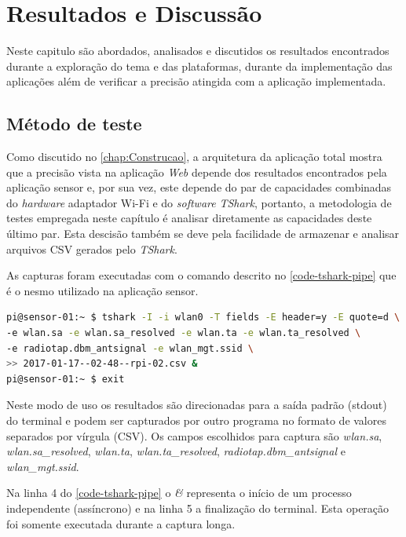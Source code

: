 \chapter{Resultados e Discussão}
\label{chap:resultados}

Neste capitulo são abordados, analisados e discutidos os resultados encontrados
durante a exploração do tema e das plataformas, durante da implementação das
aplicações além de verificar a precisão atingida com a aplicação implementada.


\section{Método de teste}
\label{sec:metodo-teste}

Como discutido no \autoref{chap:Construcao}, a arquitetura da aplicação total
mostra que a precisão vista na aplicação \emph{Web} depende dos resultados
encontrados pela aplicação sensor e, por sua vez, este depende do par de
capacidades combinadas do \emph{hardware} adaptador Wi-Fi e do \emph{software}
\emph{TShark}, portanto, a metodologia de testes empregada neste capítulo é
analisar diretamente as capacidades deste último par. Esta descisão também se
deve pela facilidade de armazenar e analisar arquivos CSV gerados pelo
\emph{TShark}.

As capturas foram executadas com o comando descrito no \autoref{code-tshark-pipe}
que é o nesmo utilizado na aplicação sensor.

\begin{lstlisting}[language=bash,caption={TShark e redirecionamento da saída para arquivo assíncrono},label=code-tshark-pipe]
pi@sensor-01:~ $ tshark -I -i wlan0 -T fields -E header=y -E quote=d \
-e wlan.sa -e wlan.sa_resolved -e wlan.ta -e wlan.ta_resolved \
-e radiotap.dbm_antsignal -e wlan_mgt.ssid \
>> 2017-01-17--02-48--rpi-02.csv &
pi@sensor-01:~ $ exit
\end{lstlisting}

Neste modo de uso os resultados são direcionadas para a saída padrão
(stdout)  do terminal e podem ser capturados por outro programa no formato
de valores separados por vírgula (CSV). Os campos escolhidos para captura
são \emph{wlan.sa}, \emph{wlan.sa\_resolved}, \emph{wlan.ta},
\emph{wlan.ta\_resolved}, \emph{radiotap.dbm\_antsignal} e \emph{wlan\_mgt.ssid}.

Na linha 4 do \autoref{code-tshark-pipe} o \emph{&} representa o início
de um processo independente (assíncrono) e na linha 5 a finalização do terminal.
Esta operação foi somente executada durante a captura longa.

